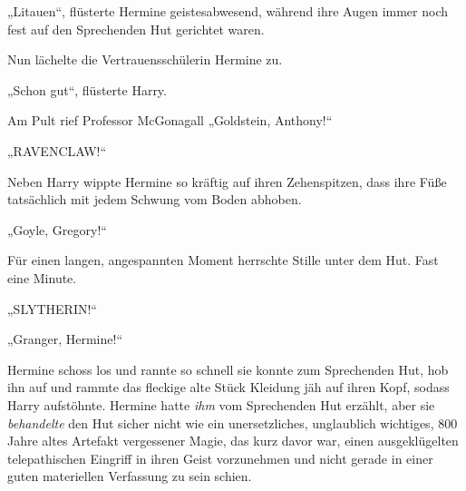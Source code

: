 



„Litauen“, flüsterte Hermine geistesabwesend, während ihre Augen immer noch fest auf den Sprechenden Hut gerichtet waren.

Nun lächelte die Vertrauensschülerin Hermine zu.

„Schon gut“, flüsterte Harry.

Am Pult rief Professor McGonagall
„Goldstein, Anthony!“

„RAVENCLAW!“

Neben Harry wippte Hermine so kräftig auf ihren Zehenspitzen, dass ihre Füße tatsächlich mit jedem Schwung vom Boden abhoben.

„Goyle, Gregory!“

Für einen langen, angespannten Moment herrschte Stille unter dem Hut. Fast eine Minute.

„SLYTHERIN!“

„Granger, Hermine!“

Hermine schoss los und rannte so schnell sie konnte zum Sprechenden Hut, hob ihn auf und rammte das fleckige alte Stück Kleidung jäh auf ihren Kopf, sodass Harry aufstöhnte. Hermine hatte \emph{ihm} vom Sprechenden Hut erzählt, aber sie \emph{behandelte} den Hut sicher nicht wie ein unersetzliches, unglaublich wichtiges, 800 Jahre altes Artefakt vergessener Magie, das kurz davor war, einen ausgeklügelten telepathischen Eingriff in ihren Geist vorzunehmen und nicht gerade in einer guten materiellen Verfassung zu sein schien.

